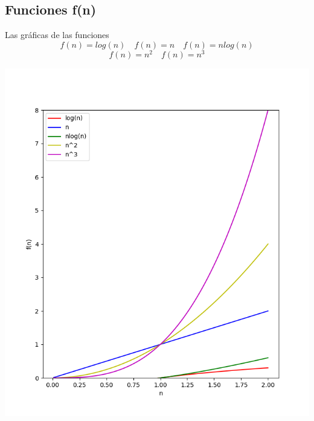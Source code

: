 \documentclass[14pt,a4paper]{report}
\begin{document}
\subsection*{Funciones f(n)}
\quad Las gráficas de las funciones
\begin{equation*}
	f(n)=log(n)\quad f(n)=n \quad f(n)=nlog(n)
\end{equation*}
\begin{equation*}
	f(n)=n^2\quad f(n)=n^3
\end{equation*}
\begin{center}
\includegraphics[scale=1]{../grafica-funciones.png} 
\end{center}
\end{document}
